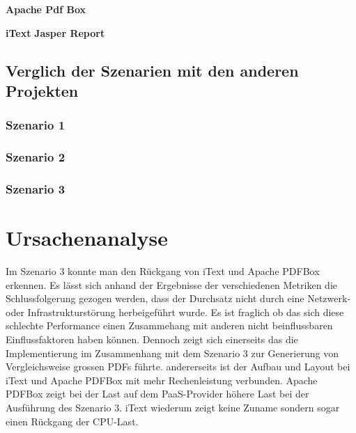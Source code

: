 \documentclass[main.tex]{subfiles}
\begin{document}
\textbf{Apache Pdf Box}

\textbf{iText}
\textbf{Jasper Report}
\subsection{Verglich der Szenarien mit den anderen Projekten }


\subsubsection{Szenario 1}




\subsubsection{Szenario 2}


\subsubsection{Szenario 3}





\section{Ursachenanalyse}

Im Szenario 3 konnte man den Rückgang von iText und Apache PDFBox erkennen. Es lässt sich anhand der Ergebnisse der verschiedenen Metriken die  Schlussfolgerung gezogen werden, dass der Durchsatz nicht durch eine Netzwerk- oder Infrastrukturstörung herbeigeführt wurde. Es ist fraglich ob das sich diese schlechte Performance einen Zusammehang mit anderen nicht beinflussbaren Einflussfaktoren haben können. Dennoch zeigt sich einerseits das die Implementierung im Zusammenhang mit dem Szenario 3 zur Generierung von Vergleichsweise grossen PDFs führte. andererseits ist der Aufbau und Layout bei iText und Apache PDFBox mit mehr Rechenleistung verbunden. Apache PDFBox zeigt bei der Last auf dem PaaS-Provider höhere Last bei der Ausführung des Szenario 3. iText wiederum zeigt keine Zuname sondern sogar einen Rückgang der CPU-Last. 
\end{document}
